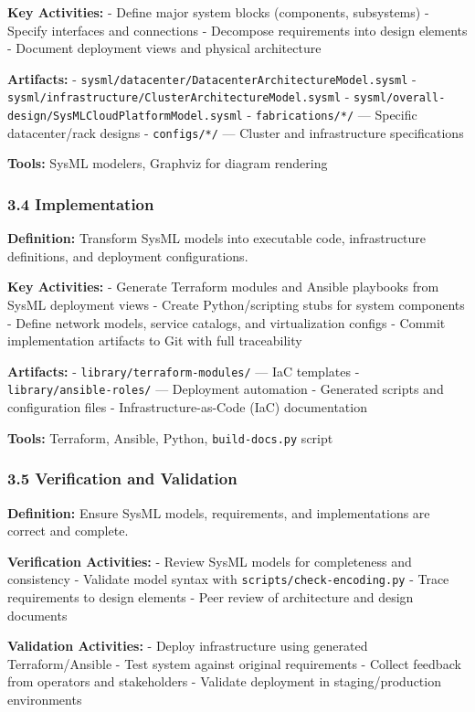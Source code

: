 \documentclass[12pt]{article}
\begin{document}
\textbf{Key Activities:} - Define major system blocks (components,
subsystems) - Specify interfaces and connections - Decompose
requirements into design elements - Document deployment views and
physical architecture

\textbf{Artifacts:} -
\texttt{sysml/datacenter/DatacenterArchitectureModel.sysml} -
\texttt{sysml/infrastructure/ClusterArchitectureModel.sysml} -
\texttt{sysml/overall-design/SysMLCloudPlatformModel.sysml} -
\texttt{fabrications/*/} --- Specific datacenter/rack designs -
\texttt{configs/*/} --- Cluster and infrastructure specifications

\textbf{Tools:} SysML modelers, Graphviz for diagram rendering

\subsubsection{3.4 Implementation}\label{implementation}

\textbf{Definition:} Transform SysML models into executable code,
infrastructure definitions, and deployment configurations.

\textbf{Key Activities:} - Generate Terraform modules and Ansible
playbooks from SysML deployment views - Create Python/scripting stubs
for system components - Define network models, service catalogs, and
virtualization configs - Commit implementation artifacts to Git with
full traceability

\textbf{Artifacts:} - \texttt{library/terraform-modules/} --- IaC
templates - \texttt{library/ansible-roles/} --- Deployment automation -
Generated scripts and configuration files - Infrastructure-as-Code (IaC)
documentation

\textbf{Tools:} Terraform, Ansible, Python, \texttt{build-docs.py}
script

\subsubsection{3.5 Verification and
Validation}\label{verification-and-validation}

\textbf{Definition:} Ensure SysML models, requirements, and
implementations are correct and complete.

\textbf{Verification Activities:} - Review SysML models for completeness
and consistency - Validate model syntax with
\texttt{scripts/check-encoding.py} - Trace requirements to design
elements - Peer review of architecture and design documents

\textbf{Validation Activities:} - Deploy infrastructure using generated
Terraform/Ansible - Test system against original requirements - Collect
feedback from operators and stakeholders - Validate deployment in
staging/production environments
\end{document}
